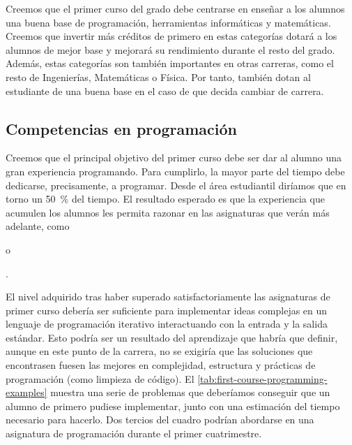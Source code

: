 Creemos que el primer curso del grado debe centrarse en
enseñar a los alumnos una buena base de
programación,
herramientas informáticas y
matemáticas.
Creemos que invertir más créditos de primero en estas categorías
dotará a los alumnos de mejor base y
mejorará su rendimiento durante el resto del grado. 
Además, estas categorías son también importantes en otras carreras,
como el resto de Ingenierías, Matemáticas o Física.
Por tanto, también dotan al estudiante de una buena base
en el caso de que decida cambiar de carrera.

\subsection{Competencias en programación}

Creemos que el principal objetivo del primer curso debe ser
dar al alumno una gran experiencia programando.
Para cumplirlo, la mayor parte del tiempo debe dedicarse,
precisamente, a programar.
Desde el área estudiantil diríamos que
en torno un \SI{50}{\percent} del tiempo.
El resultado esperado es que la experiencia que acumulen los alumnos
les permita razonar en las asignaturas que verán más adelante,
como \subject{Programación Orientada a Objetos} o
\subject{Algoritmos y Estructuras de Datos}\footnotemark.


El nivel adquirido tras
haber superado satisfactoriamente las asignaturas de primer curso
debería ser suficiente para implementar ideas complejas en
un lenguaje de programación iterativo
interactuando con la entrada y la salida estándar.
Esto podría ser un resultado del aprendizaje que habría que definir,
aunque en este punto de la carrera,
no se exigiría que las soluciones que encontrasen fuesen las mejores en
complejidad, estructura y prácticas de programación
(como limpieza de código).
El \cref{tab:first-course-programming-examples}
muestra una serie de problemas que deberíamos conseguir que
un alumno de primero pudiese implementar,
junto con una estimación del tiempo necesario para hacerlo.
Dos tercios del cuadro podrían abordarse en
una asignatura de programación durante el primer cuatrimestre.

